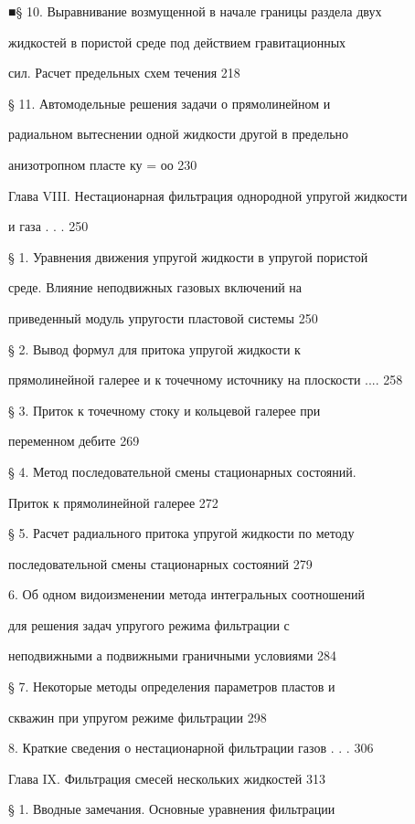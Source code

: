 \documentclass[
  11pt,
]{article}
\begin{document}
■§ 10. Выравнивание возмущенной в начале границы раздела двух \par
жидкостей в пористой среде под действием гравитационных \par
сил. Расчет предельных схем течения 218 \par
§ 11. Автомодельные решения задачи о прямолинейном и  \par
радиальном вытеснении одной жидкости другой в предельно  \par
анизотропном пласте ку = оо 230 \par
Глава VIII. Нестационарная фильтрация однородной упругой жидкости \par
и газа \textquotesingle{} . . . 250 \par
§ 1. Уравнения движения упругой жидкости в упругой пористой \par
среде. Влияние неподвижных газовых включений на  \par
приведенный модуль упругости пластовой системы 250 \par
§ 2. Вывод формул для притока упругой жидкости к  \par
прямолинейной галерее и к точечному источнику на плоскости .... 258 \par
§ 3. Приток к точечному стоку и кольцевой галерее при  \par
переменном дебите 269 \par
§ 4. Метод последовательной смены стационарных состояний.  \par
Приток к прямолинейной галерее 272 \par
§ 5. Расчет радиального притока упругой жидкости по методу \par
последовательной смены стационарных состояний 279 \par
\textbar{} 6. Об одном видоизменении метода интегральных соотношений \par
для решения задач упругого режима фильтрации с  \par
неподвижными а подвижными граничными условиями 284 \par
§ 7. Некоторые методы определения параметров пластов и  \par
скважин при упругом режиме фильтрации 298 \par
\textbar{} 8. Краткие сведения о нестационарной фильтрации газов . . . 306 \par
Глава IX. Фильтрация смесей нескольких жидкостей 313 \par
§ 1. Вводные замечания. Основные уравнения фильтрации  \par
\end{document}
